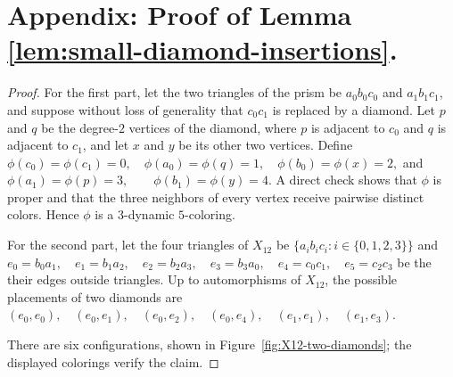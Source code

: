 \newpage
\section{Appendix: Proof of Lemma \ref{lem:small-diamond-insertions}.}



\begin{proof}
For the first part, 
let the two triangles of the prism be
$a_0b_0c_0$ and $a_1b_1c_1$, and suppose without loss of generality that $c_0c_1$ is replaced
by a diamond. Let $p$ and $q$ be the degree-$2$ vertices of the diamond,
where $p$ is adjacent to $c_0$ and $q$ is adjacent to $c_1$, and let
$x$ and $y$ be its other two vertices. Define
$
\phi(c_0)=\phi(c_1)=0,\quad
\phi(a_0)=\phi(q)=1,\quad
\phi(b_0)=\phi(x)=2,
$
and
$
\phi(a_1)=\phi(p)=3,\qquad
\phi(b_1)=\phi(y)=4.
$
A direct check shows that $\phi$ is proper and that the three neighbors
of every vertex receive pairwise distinct colors. Hence $\phi$ is a
$3$-dynamic $5$-coloring.

For the second part, let
the four triangles of $X_{12}$ be 
$\{a_ib_ic_i: i\in \{0,1,2,3\}\}$ and
$
e_0=b_0a_1,\quad e_1=b_1a_2,\quad
e_2=b_2a_3,\quad e_3=b_3a_0,\quad
e_4=c_0c_1,\quad e_5=c_2c_3
$
be the their edges outside triangles. Up to automorphisms of $X_{12}$, the
possible placements of two diamonds are
$
(e_0,e_0),\quad (e_0,e_1),\quad (e_0,e_2),\quad
(e_0,e_4),\quad (e_1,e_1),\quad (e_1,e_3).
$

There are six configurations, shown in
Figure~\ref{fig:X12-two-diamonds}; the displayed colorings verify the claim.
\end{proof}


